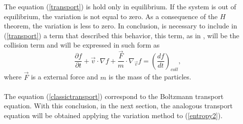 \documentclass{article}
\begin{document}
The equation (\ref{transport}) is hold only in equilibrium. If the system is out of equilibrium, the variation is not equal to zero. As a consequence of the $H$ theorem, the variation is less to zero. In conclusion, is necessary to include in (\ref{transport}) a term that described this behavior, this term, as in \cite{huang}, will be the collision term and will be expressed in such form as
\begin{equation}
    \frac{\partial f}{\partial t}+\vec{v}\cdot \nabla f+\frac{\vec{F}}{m}\cdot \nabla_{\vec{v}} f=\left( \frac{df}{dt} \right)_{coll}, \label{classictransport}
\end{equation}
where $\vec{F}$ is a external force and $m$ is the mass of the particles.\\
\\
The equation (\ref{classictransport}) correspond to the Boltzmann transport equation. With this conclusion, in the next section, the analogous transport equation will be obtained applying the variation method to (\ref{entropy2}).
\end{document}
